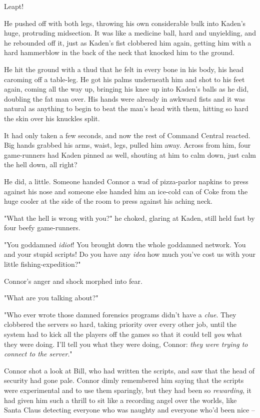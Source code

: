 Leapt!

He pushed off with both legs, throwing his own considerable bulk
into Kaden's huge, protruding midsection. It was like a medicine
ball, hard and unyielding, and he rebounded off it, just as Kaden's
fist clobbered him again, getting him with a hard hammerblow in the
back of the neck that knocked him to the ground.

He hit the ground with a thud that he felt in every bone in his
body, his head caroming off a table-leg. He got his palms
underneath him and shot to his feet again, coming all the way up,
bringing his knee up into Kaden's balls as he did, doubling the fat
man over. His hands were already in awkward fists and it was
natural as anything to begin to beat the man's head with them,
hitting so hard the skin over his knuckles split.

It had only taken a few seconds, and now the rest of Command
Central reacted. Big hands grabbed his arms, waist, legs, pulled
him away. Across from him, four game-runners had Kaden pinned as
well, shouting at him to calm down, just calm the hell down, all
right?

He did, a little. Someone handed Connor a wad of pizza-parlor
napkins to press against his nose and someone else handed him an
ice-cold can of Coke from the huge cooler at the side of the room
to press against his aching neck.

"What the hell is wrong with you?" he choked, glaring at Kaden,
still held fast by four beefy game-runners.

"You goddamned \emph{idiot}! You brought down the whole goddamned
network. You and your stupid scripts! Do you have any \emph{idea}
how much you've cost us with your little fishing-expedition?"

Connor's anger and shock morphed into fear.

"What are you talking about?"

"Who ever wrote those damned forensics programs didn't have a
\emph{clue}. They clobbered the servers so hard, taking priority
over every other job, until the system had to kick all the players
off the games so that it could tell \emph{you} what they were
doing. I'll tell you what they were doing, Connor:
\emph{they were trying to connect to the server}."

Connor shot a look at Bill, who had written the scripts, and saw
that the head of security had gone pale. Connor dimly remembered
him saying that the scripts were experimental and to use them
sparingly, but they had been so \emph{rewarding}, it had given him
such a thrill to sit like a recording angel over the worlds, like
Santa Claus detecting everyone who was naughty and everyone who'd
been nice --

